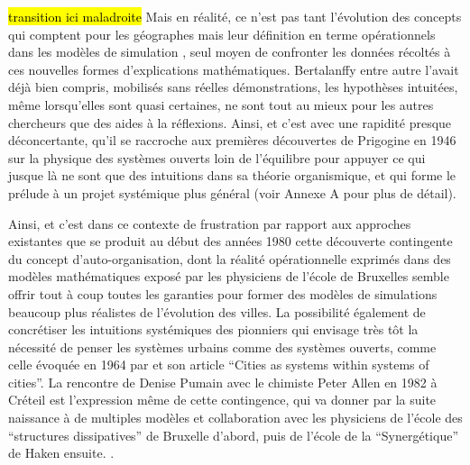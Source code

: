 \hl{transition ici maladroite}
Mais en réalité, ce n'est pas tant l'évolution des concepts qui comptent pour les géographes mais leur définition en terme opérationnels dans les modèles de simulation \autocite{Pumain2003}, seul moyen de confronter les données récoltés à ces nouvelles formes d'explications mathématiques. Bertalanffy entre autre l'avait déjà bien compris, mobilisés sans réelles démonstrations, les hypothèses intuitées, même lorsqu'elles sont quasi certaines, ne sont tout au mieux pour les autres chercheurs que des aides à la réflexions. Ainsi, et c'est avec une rapidité presque déconcertante, qu'il se raccroche aux premières découvertes de Prigogine en 1946 sur la physique des systèmes ouverts loin de l'équilibre pour appuyer ce qui jusque là ne sont que des intuitions dans sa théorie organismique, et qui forme le prélude à un projet systémique plus général (voir Annexe A pour plus de détail).

Ainsi, et c'est dans ce contexte de frustration par rapport aux approches existantes  que se produit au début des années 1980 cette découverte contingente du concept d'auto-organisation, dont la réalité opérationnelle exprimés dans des modèles mathématiques exposé par les physiciens de l'école de Bruxelles semble offrir tout à coup toutes les garanties pour former des modèles de simulations beaucoup plus réalistes de l'évolution des villes.  \autocite[350]{Pumain1998a} La possibilité également de concrétiser les intuitions systémiques des pionniers qui envisage très tôt la nécessité de penser les systèmes urbains comme des systèmes ouverts, comme celle évoquée en 1964 par \textcite{Berry1964a} et son article \enquote{Cities as systems within systems of cities}. La rencontre de Denise Pumain avec le chimiste  Peter Allen en 1982 à Créteil  est l'expression même de cette contingence, qui va donner par la suite naissance à de multiples modèles et collaboration avec les physiciens de l'école des \enquote{structures dissipatives} de Bruxelle d'abord, puis de l'école de la \enquote{Synergétique} de Haken ensuite. \autocites[27]{Pumain2003}{Pumain1982b, Schmid2014}.

